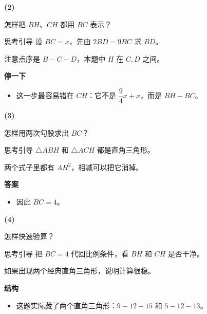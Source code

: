 \documentclass{exam-zh}
\newenvironment{eduSubQuestionItem}[1]{%
  \needspace{4\baselineskip}%
  \vspace{2mm}
  \par\noindent
  \hangindent=8mm\hangafter=1
  {\color{edu-blue}\bfseries #1}\enspace
  \begingroup
  \color{edu-ink}
}{%
  \endgroup
  \par
  \vspace{3mm}
}
\newenvironment{eduBulletList}{%
  \begin{itemize}[
    label=\textbullet,
    leftmargin=5mm,
    itemsep=1.2mm,
    topsep=0pt,
    parsep=0pt
  ]
}{%
  \end{itemize}
}
\begin{document}
\begin{eduSubQuestionItem}{(2)}
怎样把 $BH$、$CH$ 都用 $BC$ 表示？\end{eduSubQuestionItem}

\begin{eduSolutionBox}{思考引导}
  \begingroup
  \setlength{\parskip}{2.5mm}
设 $BC=x$，先由 $2BD=9BC$ 求 $BD$。\par
注意点序是 $B-C-D$，本题中 $H$ 在 $C,D$ 之间。\par
  \endgroup
  \vspace{2.5mm}
  {\color{edu-blue}\bfseries\small 停一下}\par\vspace{1.5mm}
  \begin{eduBulletList}
    \item 这一步最容易错在 $CH$：它不是 $\dfrac94x+x$，而是 $BH-BC$。  \end{eduBulletList}
\end{eduSolutionBox}




\begin{eduSubQuestionItem}{(3)}
怎样用两次勾股求出 $BC$？\end{eduSubQuestionItem}

\begin{eduSolutionBox}{思考引导}
  \begingroup
  \setlength{\parskip}{2.5mm}
$\triangle ABH$ 和 $\triangle ACH$ 都是直角三角形。\par
两个式子里都有 $AH^2$，相减可以把它消掉。\par
  \endgroup
  \vspace{2.5mm}
  {\color{edu-blue}\bfseries\small 答案}\par\vspace{1.5mm}
  \begin{eduBulletList}
    \item 因此 $BC=4$。  \end{eduBulletList}
\end{eduSolutionBox}




\begin{eduSubQuestionItem}{(4)}
怎样快速验算？\end{eduSubQuestionItem}

\begin{eduSolutionBox}{思考引导}
  \begingroup
  \setlength{\parskip}{2.5mm}
把 $BC=4$ 代回比例条件，看 $BH$ 和 $CH$ 是否干净。\par
如果出现两个经典直角三角形，说明计算很稳。\par
  \endgroup
  \vspace{2.5mm}
  {\color{edu-blue}\bfseries\small 结构}\par\vspace{1.5mm}
  \begin{eduBulletList}
    \item 这题实际藏了两个直角三角形：$9-12-15$ 和 $5-12-13$。  \end{eduBulletList}
\end{eduSolutionBox}
\end{document}

